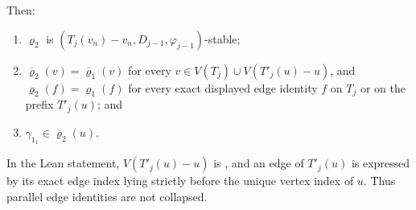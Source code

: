 \begin{lemma}
Then:
\begin{enumerate}
\item[(c1)] \(\varrho_2\) is
 \((T_j(v_n)-v_n,D_{j-1},\varphi_{j-1})\)-stable;
\item[(c2)]
 \(\overline\varrho_2(v)=\overline\varrho_1(v)\) for every
 \(v\in V(T_j)\cup V(T'_j(u)-u)\), and
 \(\varrho_2(f)=\varrho_1(f)\) for every exact displayed edge identity
 \(f\) on \(T_j\) or on the prefix \(T'_j(u)\); and
\item[(c3)] \(\gamma_{1_1}\in\overline\varrho_2(u)\).
\end{enumerate}
In the Lean statement, \(V(T'_j(u)-u)\) is
, and an edge of \(T'_j(u)\) is expressed by
its exact edge index lying strictly before the unique vertex index of
\(u\).  Thus parallel edge identities are not collapsed.
\end{lemma}
